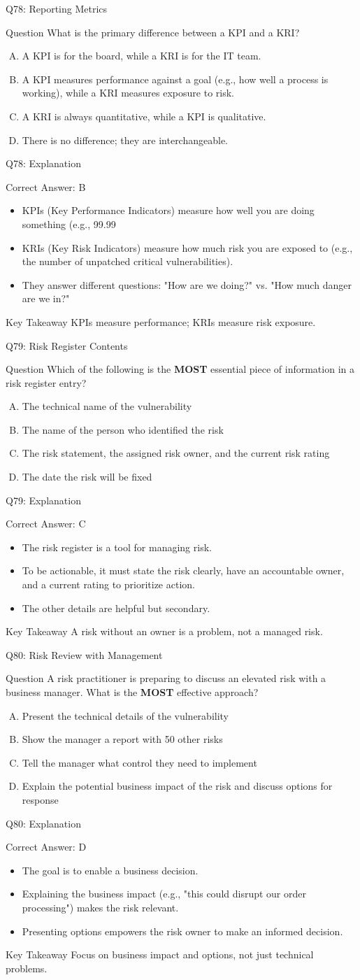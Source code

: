 \documentclass[aspectratio=169]{beamer}
\newcommand{\hq}[7]{%
	\begin{frame}{Q#1: #2}
		\begin{block}{Question}
			#3
		\end{block}
		\begin{enumerate}[(A)]
			#4
		\end{enumerate}
	\end{frame}
	\begin{frame}{Q#1: Explanation}
		\begin{block}{Correct Answer: #5}
			\begin{itemize}
				#6
			\end{itemize}
		\end{block}
		\begin{alertblock}{Key Takeaway}
			#7
		\end{alertblock}
	\end{frame}
}
\begin{document}
	\hq{78}{Reporting Metrics}
	{What is the primary difference between a KPI and a KRI?}
	{\item A KPI is for the board, while a KRI is for the IT team.
		\item A KPI measures performance against a goal (e.g., how well a process is working), while a KRI measures exposure to risk.
		\item A KRI is always quantitative, while a KPI is qualitative.
		\item There is no difference; they are interchangeable.}
	{B}
	{\item KPIs (Key Performance Indicators) measure how well you are doing something (e.g., 99.99%
		\item KRIs (Key Risk Indicators) measure how much risk you are exposed to (e.g., the number of unpatched critical vulnerabilities).
		\item They answer different questions: "How are we doing?" vs. "How much danger are we in?"}
	{KPIs measure performance; KRIs measure risk exposure.}
	
	\hq{79}{Risk Register Contents}
	{Which of the following is the \textbf{MOST} essential piece of information in a risk register entry?}
	{\item The technical name of the vulnerability
		\item The name of the person who identified the risk
		\item The risk statement, the assigned risk owner, and the current risk rating
		\item The date the risk will be fixed}
	{C}
	{\item The risk register is a tool for managing risk.
		\item To be actionable, it must state the risk clearly, have an accountable owner, and a current rating to prioritize action.
		\item The other details are helpful but secondary.}
	{A risk without an owner is a problem, not a managed risk.}
	
	\hq{80}{Risk Review with Management}
	{A risk practitioner is preparing to discuss an elevated risk with a business manager. What is the \textbf{MOST} effective approach?}
	{\item Present the technical details of the vulnerability
		\item Show the manager a report with 50 other risks
		\item Tell the manager what control they need to implement
		\item Explain the potential business impact of the risk and discuss options for response}
	{D}
	{\item The goal is to enable a business decision.
		\item Explaining the business impact (e.g., "this could disrupt our order processing") makes the risk relevant.
		\item Presenting options empowers the risk owner to make an informed decision.}
	{Focus on business impact and options, not just technical problems.}
	
\end{document}
